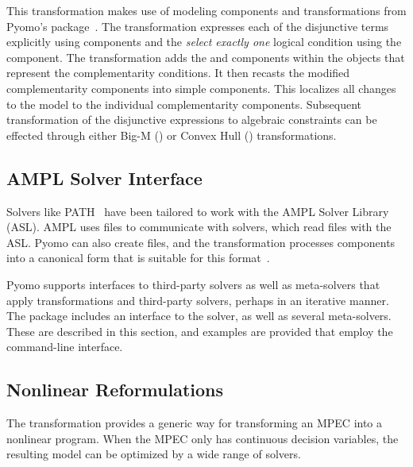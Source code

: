 This transformation makes use of modeling components and transformations
from Pyomo's  package~\cite{PyomoGDP}.  The
transformation expresses each of the disjunctive terms explicitly using
 components and the \emph{select exactly one} logical
condition using the  component.  The transformation
adds the  and  components within the
objects that represent the complementarity conditions.  It then recasts
the modified complementarity components into simple 
components.  This localizes all changes to the model to the individual
complementarity components.  Subsequent transformation of the
disjunctive expressions to algebraic constraints can be effected through
either Big-M () or Convex Hull ()
transformations.



\subsection{AMPL Solver Interface}

Solvers like PATH~\cite{FerMun98} have been tailored to work with
the AMPL Solver Library (ASL).  AMPL uses  files to
communicate with solvers, which read  files with the ASL.
Pyomo can also create  files, and the 
transformation processes  components into a
canonical form that is suitable for this format~\cite{FerFouGay99}.


\label{sec:solvers}

Pyomo supports interfaces to third-party solvers as well as meta-solvers that 
apply transformations and third-party solvers, perhaps in an iterative manner.
The  package includes an interface to the  solver, as well as several 
meta-solvers.  These are described in this section, and examples are provided that 
employ the  command-line interface.


\subsection{Nonlinear Reformulations}

The  transformation provides a generic
way for transforming an MPEC into a nonlinear program.  When the
MPEC only has continuous decision variables, the resulting model
can be optimized by a wide range of solvers.

